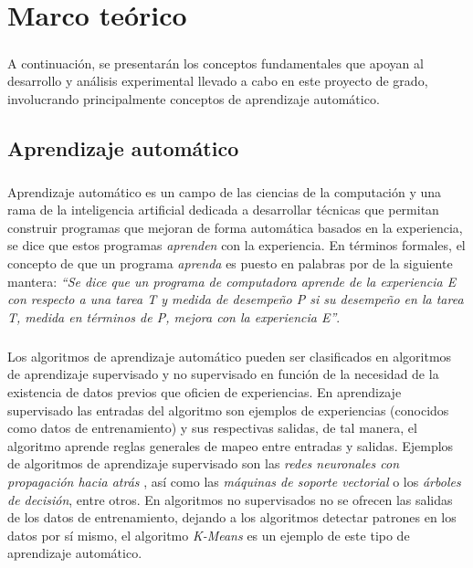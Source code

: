 \chapter{Marco teórico} \label{section-marco-teorico}

\paragraph{} A continuación, se presentarán los conceptos fundamentales que apoyan al desarrollo y análisis experimental llevado a cabo en este proyecto de grado, involucrando principalmente conceptos de aprendizaje automático.

\section{Aprendizaje automático}

\paragraph{}Aprendizaje automático es un campo de las ciencias de la computación y una rama de la inteligencia artificial dedicada a desarrollar técnicas que permitan construir programas que mejoran de forma automática basados en la experiencia, se dice que estos programas \textit{aprenden} con la experiencia. En términos formales, el concepto de que un programa \textit{aprenda} es puesto en palabras por \citet{mitchell1997machine} de la siguiente mantera: \textit{“Se dice que un programa de computadora aprende de la experiencia E con respecto a una tarea T y medida de desempeño P si su desempeño en la tarea T, medida en términos de P, mejora con la experiencia E”}. 

\paragraph{}Los algoritmos de aprendizaje automático pueden ser clasificados en algoritmos de aprendizaje supervisado y no supervisado en función de la necesidad de la existencia de datos previos que oficien de experiencias. En aprendizaje supervisado las entradas del algoritmo son ejemplos de experiencias (conocidos como datos de entrenamiento) y sus respectivas salidas, de tal manera, el algoritmo aprende reglas generales de mapeo entre entradas y salidas. Ejemplos de algoritmos de aprendizaje supervisado son las \textit{redes neuronales con propagación hacia atrás} , así como las \textit{máquinas de soporte vectorial} o los \textit{árboles de decisión}, entre otros. En algoritmos no supervisados no se ofrecen las salidas de los datos de entrenamiento, dejando a los algoritmos detectar patrones en los datos por sí mismo, el algoritmo \textit{K-Means} es un ejemplo de este tipo de aprendizaje automático. 

